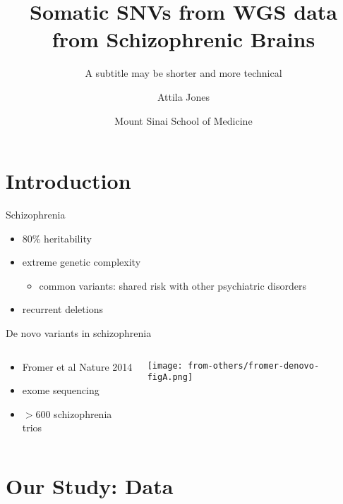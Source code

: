 \documentclass{beamer}
\title{Somatic SNVs from WGS data from Schizophrenic Brains}
\subtitle{A subtitle may be shorter and more technical}
\author{Attila Jones}
\date{Mount Sinai School of Medicine}
\begin{document}
\maketitle

\section{Introduction}

\begin{frame}{Schizophrenia}
\begin{itemize}
\item 80\% heritability
\item extreme genetic complexity
	\begin{itemize}
		\item common variants: shared risk with other psychiatric
			disorders
	\end{itemize}
\item recurrent deletions%
\end{itemize}
\end{frame}


\begin{frame}{De novo variants in schizophrenia}
\begin{columns}[t]
\begin{column}{0.5\textwidth}
\begin{itemize}
        \item Fromer et al Nature 2014
        \item exome sequencing
	\item \(>600\) schizophrenia trios
\end{itemize}
\end{column}

\begin{column}{0.5\textwidth}

\texttt{[image: from-others/fromer-denovo-figA.png]}
\end{column}
\end{columns}
\end{frame}

\section{Our Study: Data}
\end{document}
